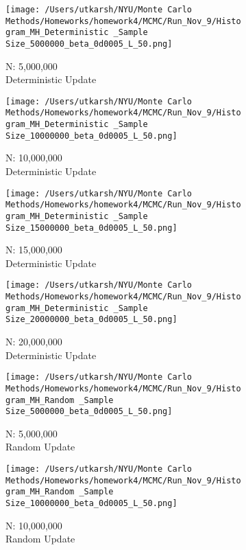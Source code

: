 \documentclass[11pt]{article}
\begin{document}
\begin{figure}[H]
	\centering
	\begin{subfigure}{.22\textwidth}
		\texttt{[image: /Users/utkarsh/NYU/Monte Carlo Methods/Homeworks/homework4/MCMC/Run\_Nov\_9/Histogram\_MH\_Deterministic \_Sample Size\_5000000\_beta\_0d0005\_L\_50.png]}
		\caption{N: 5,000,000\\Deterministic Update}
	\end{subfigure}
	\begin{subfigure}{.22\textwidth}
		\texttt{[image: /Users/utkarsh/NYU/Monte Carlo Methods/Homeworks/homework4/MCMC/Run\_Nov\_9/Histogram\_MH\_Deterministic \_Sample Size\_10000000\_beta\_0d0005\_L\_50.png]}
		\caption{N: 10,000,000\\Deterministic Update}
	\end{subfigure}
	\begin{subfigure}{.22\textwidth}
		\texttt{[image: /Users/utkarsh/NYU/Monte Carlo Methods/Homeworks/homework4/MCMC/Run\_Nov\_9/Histogram\_MH\_Deterministic \_Sample Size\_15000000\_beta\_0d0005\_L\_50.png]}
		\caption{N: 15,000,000\\Deterministic Update}
	\end{subfigure}
	\begin{subfigure}{.22\textwidth}
		\texttt{[image: /Users/utkarsh/NYU/Monte Carlo Methods/Homeworks/homework4/MCMC/Run\_Nov\_9/Histogram\_MH\_Deterministic \_Sample Size\_20000000\_beta\_0d0005\_L\_50.png]}
		\caption{N: 20,000,000\\Deterministic Update}
	\end{subfigure}
    \begin{subfigure}{.22\textwidth}
        \texttt{[image: /Users/utkarsh/NYU/Monte Carlo Methods/Homeworks/homework4/MCMC/Run\_Nov\_9/Histogram\_MH\_Random \_Sample Size\_5000000\_beta\_0d0005\_L\_50.png]}
        \caption{N: 5,000,000\\Random Update}
    \end{subfigure}
    \begin{subfigure}{.22\textwidth}
        \texttt{[image: /Users/utkarsh/NYU/Monte Carlo Methods/Homeworks/homework4/MCMC/Run\_Nov\_9/Histogram\_MH\_Random \_Sample Size\_10000000\_beta\_0d0005\_L\_50.png]}
        \caption{N: 10,000,000\\Random Update}
    \end{subfigure}
    \begin{subfigure}{.22\textwidth}

\end{subfigure}
\end{figure}
\end{document}
